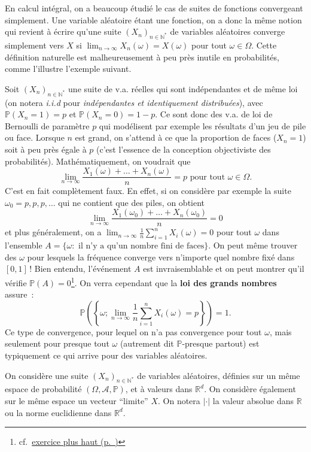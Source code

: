 En calcul intégral, on a beaucoup étudié le cas de suites de fonctions
convergeant simplement. Une variable aléatoire étant une fonction, on a
donc la même notion qui revient à écrire qu'une suite
\((X_n)_{n\in \mathbb{N}^\ast}\) de variables aléatoires converge
simplement vers \(X\) si \(\lim_{n \to \infty} X_n(\omega) = X(\omega)\)
pour tout \(\omega \in \Omega\). Cette définition naturelle est
malheureusement à peu près inutile en probabilités, comme l'illustre
l'exemple suivant.

\begin{exemple}\label{IV-pfinf}

Soit \((X_n)_{n\in \mathbb{N}^\ast}\) une suite de v.a. réelles qui sont
indépendantes et de même loi (on notera \emph{i.i.d} pour
\emph{indépendantes et identiquement distribuées}), avec
\(\mathbb{P}(X_n = 1) = p\) et \(\mathbb{P}(X_n=0) = 1-p\). Ce sont donc
des v.a. de loi de Bernoulli de paramètre \(p\) qui modélisent par
exemple les résultats d'un jeu de pile ou face. Lorsque \(n\) est grand,
on s'attend à ce que la proportion de faces (\(X_n=1\)) soit à peu près
égale à \(p\) (c'est l'essence de la conception objectiviste des
probabilités). Mathématiquement, on voudrait que
\[\lim_{n \to \infty} \frac{X_1(\omega) + \ldots +X_n(\omega)}{n} = p \text{   pour tout }\omega\in\Omega.\]
C'est en fait complètement faux. En effet, si on considère par exemple
la suite \(\omega_0 = {p,p,p,\ldots}\) qui ne contient que des piles, on
obtient
\[\lim_{n \to \infty} \frac{X_1(\omega_0) + \ldots +X_n(\omega_0)}{n} = 0\]
et plus généralement, on a
\(\lim_{n \to \infty} \frac{1}{n}\sum_{i=1}^n X_i(\omega) = 0\) pour
tout \(\omega\) dans l'ensemble
\(A = \{\omega : \text{ il n'y a qu'un nombre fini de faces}\}\). On
peut même trouver des \(\omega\) pour lesquels la fréquence converge
vers n'importe quel nombre fixé dans \([0,1]\)\,! Bien entendu,
l'événement \(A\) est invraisemblable et on peut montrer qu'il vérifie
\(\mathbb{P}(A) = 0\)\footnote{cf.~\protect\hyperref[IV-pf]{exercice
  plus haut (p.~\pageref*{IV-pf})}}. On verra cependant que la
\textbf{loi des grands nombres} assure~:
\[\mathbb{P}\left(\left\{\omega ; \lim_{n \to \infty} \frac{1}{n}\sum_{i=1}^n X_i(\omega) = p\right\}\right)=1.\]
Ce type de convergence, pour lequel on n'a pas convergence pour tout
\(\omega\), mais seulement pour presque tout \(\omega\) (autrement dit
\(\mathbb{P}\)-presque partout) est typiquement ce qui arrive pour des
variables aléatoires.

On considère une suite \((X_n)_{n\in \mathbb{N}^\ast}\) de variables
aléatoires, définies sur un même espace de probabilité
\((\Omega, \mathcal{A}, \mathbb{P})\), et à valeurs dans
\(\mathbb{R}^d\). On considère également sur le même espace un vecteur
``limite'' \(X\). On notera \(|\cdot|\) la valeur absolue dans
\(\mathbb{R}\) ou la norme euclidienne dans \(\mathbb{R}^d\).
\end{exemple}

